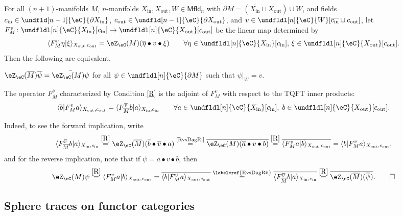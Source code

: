 \documentclass[12pt,reqno]{amsart}
\newcommand{\Mfld}{\mathsf{Mfld}}
\newcommand{\inn}{\mathrm{in}}
\newcommand{\out}{\mathrm{out}}
\newcommand{\C}{\eC}
\newcommand{\Z}{\eZ}
\newcommand{\bdy}{\partial}
\newcommand{\fcj}[1]{\overline{#1}}
\newcommand{\orev}{\overline}
\newcommand{\bkt}[2]{\langle #1|#2 \rangle}
\renewcommand{\amalg}{\sqcup}
\begin{document}
\begin{proposition}
\label{bordism gives a linear map}
\label{RvsDagR}
For all $(n+1)$-manifolds $M$, $n$-manifolds $X_{\inn},X_{\out},W\in\Mfld_{n}$ with $\bdy M=(\orev{X_{\inn}}\amalg X_{\out})\cup W$, and fields $c_\inn\in\undfld[n-1]{\C}{\partial X_\inn}$, $c_\out\in\undfld[n-1]{\C}{\partial X_\out}$, and $v\in \undfldl[n]{\C}{W}[\fcj{c_{\inn}}\amalg c_{\out}]$, let $F_{M}^v\colon \undfldl[n]{\C}{X_{\inn}}[c_{\inn}]\to \undfldl[n]{\C}{X_{\out}}[c_{\out}]$ be the linear map determined by 
\begin{equation}
\label{R}
\bkt{F_{M}^v\eta}{\xi}_{X_{\out},c_{\out}}=\Z_\C(M)(\fcj{\eta}\bullet
v\bullet
\xi)\qquad\forall \eta\in \undfldl[n]{\C}{X_{\inn}}[c_{\inn}],\,\xi\in \undfldl[n]{\C}{X_{\out}}[c_{\out}].
\end{equation}
Then the following are equivalent.
\begin{lst} 
\item\label{RvsDagRi}$\Z_\C(\orev{M})\fcj{\psi}=\bar{\Z_\C(M)\psi}$ for all $\psi\in \undfldl[n]{\C}{\bdy M}$ such that $\psi|_{W}=v$.
\item\label{RvsDagRii} The operator $F_{\orev M}^{\fcj{v}}$ characterized by Condition \ref{R} is the adjoint of $F_M^v$ with respect to the TQFT inner products:
\[
    \bkt{b}{F_M^v a}_{X_{\out},c_{\out}}=\bkt{F_{\orev M}^{\fcj v}b}{a}_{X_{\inn},c_{\inn}}\qquad\forall a\in \undfldl[n]{\C}{X_{\inn}}[c_{\inn}],\;b\in \undfldl[n]{\C}{X_{\out}}[c_{\out}].
\]
\end{lst}
\end{proposition}

\begin{pf}
Indeed, to see the forward implication, write
\[
\bkt{F_{\orev M}^{\fcj v}b}{a}_{X_{\inn},c_{\inn}}
\overset{\eqref{R}}{=}
\Z_\C(\orev M)(\fcj{b}\bullet \fcj v\bullet a)
\overset{\text{\ref{RvsDagRi}}}{=}
\overline{\Z_\C(M)(\fcj{a}\bullet v\bullet b)}
\overset{\eqref{R}}{=}
\overline{\bkt{F_{M}^{v} a}{b}_{X_{\out},c_{\out}}}
=
\bkt{b}{F_{M}^{v} a}_{X_{\out},c_{\out}},
\]
and for the reverse implication, note that if $\psi=\fcj a\bullet v\bullet b$, then
\[ 
\Z_\C(M)\psi
\overset{\eqref{R}}{=}
\bkt{F_M^{v} a}{b}_{X_{\out},c_\out}
=\overline{\bkt{b}{F_M^{v} a}_{X_{\out},c_\out}}
\overset{\text{\labelcref{RvsDagRii}}}{=}
\overline{\bkt{F_{\orev{M}}^{\fcj{v}} b}{a}_{X_\inn,c_\inn}}
\overset{\eqref{R}}{=}
\overline{\Z_\C(\orev{M})(\fcj{\psi})}.\qedhere
\]
\end{pf}

\subsection{Sphere traces on functor categories}
\label{subsec:eFun-sphere-weight}
\end{document}
